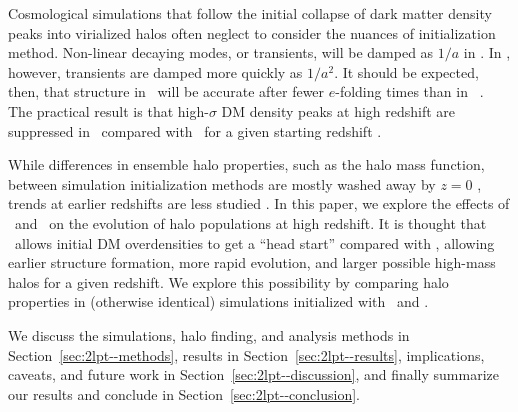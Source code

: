 

Cosmological simulations that follow the initial collapse of dark matter density peaks into virialized halos often neglect to consider the nuances of initialization method.  Non-linear decaying modes, or transients, will be damped as $1 / a$ in \za.  In \lpt, however, transients are damped more quickly as $1 / a^{2}$.  It should be expected, then, that structure in \lpt\ will be accurate after fewer $e$-folding times than in \za\ \citep{1998MNRAS.299.1097S, 2006MNRAS.373..369C, 2010MNRAS.403.1859J}.  The practical result is that high-$\sigma$ DM density peaks at high redshift are suppressed in \za\ compared with \lpt\ for a given starting redshift \citep{2006MNRAS.373..369C}.






While differences in ensemble halo properties, such as the halo mass function, between simulation initialization methods are mostly washed away by $z=0$ \citep{1998MNRAS.299.1097S}, trends at earlier redshifts are less studied \citep{2007ApJ...671.1160L}.  In this paper, we explore the effects of \za\ and \lpt\ on the evolution of halo populations at high redshift.  It is thought that \lpt\ allows initial DM overdensities to get a ``head start'' compared with \za, allowing earlier structure formation, more rapid evolution, and larger possible high-mass halos for a given redshift.  We explore this possibility by comparing halo properties in (otherwise identical) simulations initialized with \za\ and \lpt.

We discuss the simulations, halo finding, and analysis methods in Section~\ref{sec:2lpt--methods}, results in Section~\ref{sec:2lpt--results}, implications, caveats, and future work in Section~\ref{sec:2lpt--discussion}, and finally summarize our results and conclude in Section~\ref{sec:2lpt--conclusion}.




